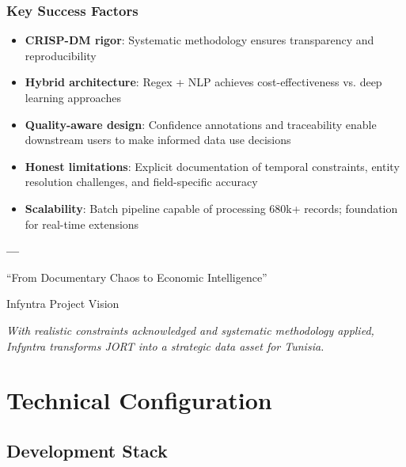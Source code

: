\documentclass[12pt,a4paper]{report}
\begin{document}
\subsection{Key Success Factors}

\begin{itemize}
    \item \textbf{CRISP-DM rigor}: Systematic methodology ensures transparency and reproducibility
    \item \textbf{Hybrid architecture}: Regex + NLP achieves cost-effectiveness vs. deep learning approaches
    \item \textbf{Quality-aware design}: Confidence annotations and traceability enable downstream users to make informed data use decisions
    \item \textbf{Honest limitations}: Explicit documentation of temporal constraints, entity resolution challenges, and field-specific accuracy
    \item \textbf{Scalability}: Batch pipeline capable of processing 680k+ records; foundation for real-time extensions
\end{itemize}

\vspace{2cm}

\begin{center}
\textbf{---}

``From Documentary Chaos to Economic Intelligence''

Infyntra Project Vision

\vspace{1cm}

\textit{With realistic constraints acknowledged and systematic methodology applied,}\\
\textit{Infyntra transforms JORT into a strategic data asset for Tunisia.}
\end{center}

\appendix

\chapter{Technical Configuration}

\section{Development Stack}
\end{document}
